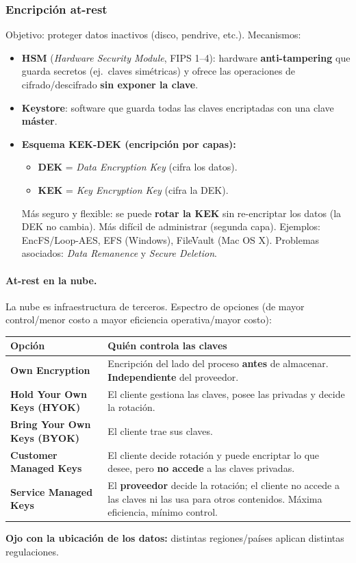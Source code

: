 \documentclass[../main.tex]{subfiles}
\begin{document}
\subsubsection{Encripción at-rest}
Objetivo: proteger datos inactivos (disco, pendrive, etc.). Mecanismos:
\begin{itemize}[nosep]
  \item \textbf{HSM} (\emph{Hardware Security Module}, FIPS 1--4): hardware
        \textbf{anti-tampering} que guarda secretos (ej.\ claves simétricas) y ofrece
        las operaciones de cifrado/descifrado \textbf{sin exponer la clave}.
  \item \textbf{Keystore}: software que guarda todas las claves encriptadas con una
        clave \textbf{máster}.
  \item \textbf{Esquema KEK-DEK (encripción por capas):}
        \begin{itemize}[nosep]
          \item \textbf{DEK} = \emph{Data Encryption Key} (cifra los datos).
          \item \textbf{KEK} = \emph{Key Encryption Key} (cifra la DEK).
        \end{itemize}
        Más seguro y flexible: se puede \textbf{rotar la KEK} sin re-encriptar los
        datos (la DEK no cambia). Más difícil de administrar (segunda capa).
        Ejemplos: EncFS/Loop-AES, EFS (Windows), FileVault (Mac OS X). Problemas
        asociados: \emph{Data Remanence} y \emph{Secure Deletion}.
\end{itemize}

\paragraph{At-rest en la nube.} La nube es infraestructura de terceros. Espectro de
opciones (de mayor control/menor costo a mayor eficiencia operativa/mayor costo):
\begin{center}
\begin{tabular}{@{}>{\bfseries}l p{10.5cm}@{}}
\toprule
Opción & Quién controla las claves \\
\midrule
Own Encryption & Encripción del lado del proceso \textbf{antes} de almacenar.
  \textbf{Independiente} del proveedor. \\
Hold Your Own Keys (HYOK) & El cliente gestiona las claves, posee las privadas y decide
  la rotación. \\
Bring Your Own Keys (BYOK) & El cliente trae sus claves. \\
Customer Managed Keys & El cliente decide rotación y puede encriptar lo que desee, pero
  \textbf{no accede} a las claves privadas. \\
Service Managed Keys & El \textbf{proveedor} decide la rotación; el cliente no accede a
  las claves ni las usa para otros contenidos. Máxima eficiencia, mínimo control. \\
\bottomrule
\end{tabular}
\end{center}
\textbf{Ojo con la ubicación de los datos:} distintas regiones/países aplican distintas
regulaciones.
\end{document}
